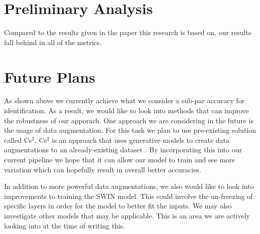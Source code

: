 \documentclass[10pt,twocolumn,letterpaper]{article}
\begin{document}
\section{Preliminary Analysis}

Compared to the results given in the paper this research is based on, our results fall behind in all of the metrics.   \par

\section{Future Plans}

As shown above we currently achieve what we consider a sub-par accuracy for identification. As a result, we would like to look into methods that can improve the robustness of our apporach. One approach we are considering in the future is the usage of data augmentation. For this task we plan to use pre-existing solution called Cs$^2$. Cs$^2$ is an approach that uses generative models to create data augmentations to an already-existing dataset \cite{cs2}. By incorporating this into our current pipeline we hope that it can allow our model to train and see more variation which can hopefully result in overall better accuracies.  \par

In addition to more powerful data augmentations, we also would like to look into improvements to training the SWIN model. This could involve the un-freezing of specific layers in order for the model to better fit the inputs. We may also investigate other models that may be applicable. This is an area we are actively looking into at the time of writing this. \par 





\end{document}
